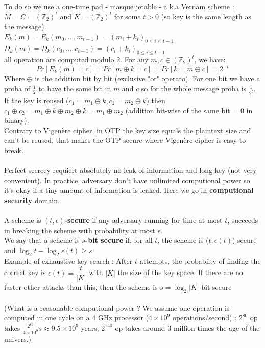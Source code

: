 \documentclass[11pt,a4paper]{report}
\begin{document}
To do so we use a one-time pad - masque jetable - a.k.a Vernam scheme :\\
$M=C=\left( \mathbb{Z}_2 \right)^t$ and $K = \left( \mathbb{Z}_2 \right)^t$ for some $t>0$ (so key is the same length as the message).\\
$E_k(m) = E_k(m_0,...,m_{t-1}) = (m_i + k_i)_{0 \leq i \leq t-1}$\\
$D_k(m) = D_k(c_0,...,c_{t-1}) = (c_i + k_i)_{0 \leq i \leq t-1}$\\
all operation are computed modulo 2. For any $m,c \in \left( \mathbb{Z}_2 \right)^t$, we have:
$$Pr[E_k(m) = c] = Pr[m \oplus k = c] = Pr[k = m \oplus c] = 2^{-t}$$
Where $\oplus$ is the addition bit by bit (exclusive "or" operato). For one bit we have a proba of $\frac{1}{2}$ to have the same bit in $m$ and $c$ so for the whole message proba is $\frac{1}{2^t}$.\\
If the key is reused ($c_1 = m_1 \oplus k, c_2 = m_2 \oplus k$) then $c_1 \oplus c_2 = m_1 \oplus k \oplus m_2 \oplus k = m_1 \oplus m_2 $ (addition bit-wise of the same bit = 0 in binary).\\
Contrary to Vigenère cipher, in OTP the key size equals the plaintext size and can't be reused, that makes the OTP secure where Vigenère cipher is easy to break.\\
\\
Perfect secrecy requiert absolutely no leak of information and long key (not very convenient). In practice, adversary don't have unlimited computional power so it's okay if a tiny amount of information is leaked. Here we go in \textbf{computional security} domain.\\
\\
A scheme is \textbf{$(t,\epsilon)$-secure} if any adversary running for time at most $t$, succeeds in breaking the scheme with probability at most $\epsilon$.\\
We say that a scheme is \textbf{$s$-bit secure} if, for all $t$, the scheme is ($t, \epsilon(t)$)-secure and $\log_2 t - \log_2 \epsilon(t) \geq s$.\\
Example of exhaustive key search : After $t$ attempts, the probabilty of finding the correct key is $\epsilon(t) = \dfrac{t}{|K|}$
with $|K|$ the size of the key space. If there are no faster other attacks than this, then the scheme is $s = \log_2 |K|$-bit secure\\
\\
(What is a reasonable computional power ? We assume one operation is computed in one cycle on a 4 GHz processor ($4 \times 10^9$ operations/second) : $2^{80}$ op takes $\frac{2^{80}}{4 \times 10^9} s \approx 9.5 \times 10^9$ years, $2^{140}$ op takes around 3 million times the age of the univers.)\\
\\
\end{document}
